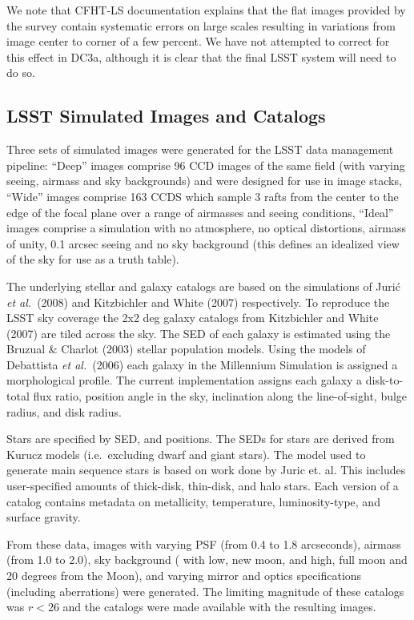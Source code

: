 We note that CFHT-LS documentation explains that the flat images
provided by the survey contain systematic errors on large scales
resulting in variations from image center to corner of a few percent.
We have not attempted to correct for this effect in DC3a,  although it
is clear that the final LSST system will need to do so.

\subsection{LSST Simulated Images and Catalogs}

Three sets of simulated images were generated for the LSST data
management pipeline: ``Deep'' images comprise 96 CCD images of the
same field (with varying seeing, airmass and sky backgrounds) and were
designed for use in image stacks, ``Wide'' images comprise 163 CCDS
which sample 3 rafts from the center to the edge of the focal plane
over a range of airmasses and seeing conditions, ``Ideal'' images
comprise a simulation with no atmosphere, no optical distortions,
airmass of unity, 0.1 arcsec seeing and no sky background (this
defines an idealized view of the sky for use as a truth table).

The underlying stellar and galaxy catalogs are based on the
simulations of Juri\'c {\it et al.}~(2008) and Kitzbichler and White
(2007) respectively.  To reproduce the LSST sky coverage the 2x2 deg
galaxy catalogs from Kitzbichler and White (2007) are tiled across the
sky.  The SED of each galaxy is estimated using the Bruzual \& Charlot
(2003) stellar population models. Using the models of Debattista
\textit{et al.}~(2006) each galaxy in the Millennium Simulation is
assigned a morphological profile. The current implementation assigns
each galaxy a disk-to-total flux ratio, position angle in the sky,
inclination along the line-of-sight, bulge radius, and disk radius.

Stars are specified by SED, and positions. The SEDs for stars are
derived from Kurucz models (i.e.\ excluding dwarf and giant
stars). The model used to generate main sequence stars is based on
work done by Juric et. al. This includes user-specified amounts of
thick-disk, thin-disk, and halo stars. Each version of a catalog
contains metadata on metallicity, temperature, luminosity-type, and
surface gravity.

From these data, images with varying PSF (from 0.4 to 1.8 arcseconds),
airmass (from 1.0 to 2.0), sky background ( with low, new moon, and
high, full moon and 20 degrees from the Moon), and varying mirror and
optics specifications (including aberrations) were generated.  The
limiting magnitude of these catalogs was $r<26$ and the catalogs were
made available with the resulting images.

